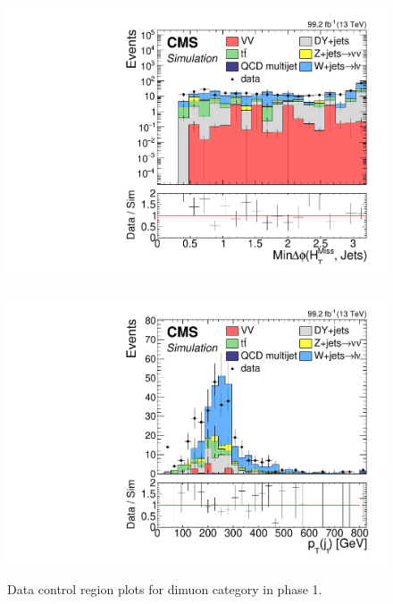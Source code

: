 \begin{figure}[!htb]
\includegraphics[width=0.48\linewidth]{plots/dilepton_muons_data_control_region_phase1/none_MinDeltaPhiMhtJets_log.pdf} \,
\includegraphics[width=0.48\linewidth]{plots/dilepton_muons_data_control_region_phase1/none_LeadingJetPt.pdf} \\

\caption[Data control region plots for dimuon category in phase 1]{Data control region plots for dimuon category in phase 1.}
\label{fig:data-control-plots-dimuon-phase1}
\end{figure} 


